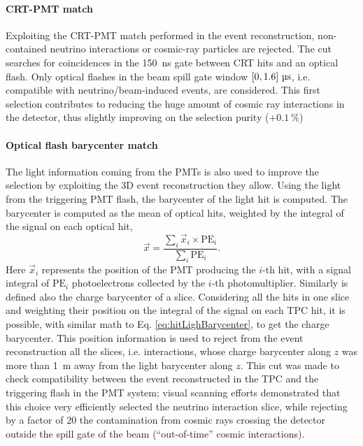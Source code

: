 \paragraph{CRT-PMT match} Exploiting the CRT-PMT match \cite{ICARUS:2025_nuMuTechNote} performed in the event reconstruction, non-contained neutrino interactions or cosmic-ray particles are rejected. The cut searches for coincidences in the \SI{150}{\ns} gate between CRT hits and an optical flash. Only optical flashes in the beam spill gate window $\qty[0,1.6]\ \si{\us}$, i.e. compatible with neutrino/beam-induced events, are considered. This first selection contributes to reducing the huge amount of cosmic ray interactions in the detector, thus slightly improving on the selection purity ($+\SI{0.1}{\percent}$)

\paragraph{Optical flash barycenter match} The light information coming from the PMTs is also used to improve the selection by exploiting the 3D event reconstruction they allow. Using the light from the triggering PMT flash, the barycenter of the light hit is computed. The barycenter is computed as the mean of optical hits, weighted by the integral of the signal on each optical hit, \begin{equation}
    \vec{x} = \frac{\sum_i \vec x_i \times \mathrm{PE}_i}{\sum_i \mathrm{PE}_i}.  \label{eq:hitLighBarycenter}
\end{equation} Here $\vec x_i$ represents the position of the PMT producing the $i$-th hit, with a signal integral of $\mathrm{PE}_i$ photoelectrons collected by the $i$-th photomultiplier. Similarly is defined also the charge barycenter of a slice. Considering all the hits in one slice and weighting their position on the integral of the signal on each TPC hit, it is possible, with similar math to Eq. \eqref{eq:hitLighBarycenter}, to get the charge barycenter.
This position information is used to reject from the event reconstruction all the slices, i.e. interactions, whose charge barycenter along $z$ was more than \SI{1}{\m} away from the light barycenter along $z$. This cut was made to check compatibility between the event reconstructed in the TPC and the triggering flash in the PMT system; visual scanning efforts demonstrated that this choice very efficiently selected the neutrino interaction slice, while rejecting by a factor of 20 the contamination from cosmic rays crossing the detector outside the spill gate of the beam (``out-of-time'' cosmic interactions).

